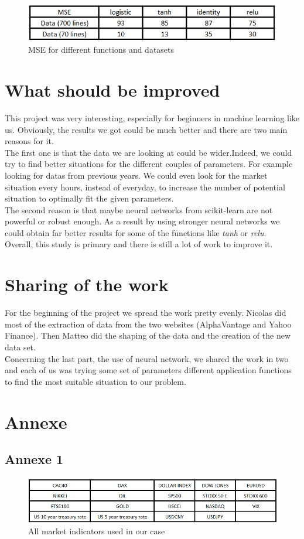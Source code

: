 \documentclass[]{article}
\begin{document}
\begin{figure}[hbt!]
	\center{}
	\includegraphics[scale=0.6]{image/results.png}
	\caption{MSE for different functions and datasets}
\end{figure}


\section{What should be improved}
\vskip 0.3cm
This project was very interesting, especially for beginners  in machine learning like us. Obviously, the results we got could be much better and there are two main reasons for it. \\
The first one is that the data we are looking at could be wider.Indeed, we could try to find better situations for the different couples of parameters. For example looking for datas from previous years. We could even look for the market situation every hours, instead of everyday, to increase the number of potential situation to optimally fit the given parameters. \\
The second reason is that maybe neural networks from scikit-learn are not powerful or robust enough. As a result by using stronger neural networks we could obtain far better results for some of the functions like \textit{tanh} or \textit{relu}. \\
Overall, this study is primary and there is still a lot of work to improve it.


\section{Sharing of the work}

\vskip 0.3cm
For the beginning of the project we spread the work pretty evenly.
Nicolas did most of the extraction of data from the two websites (AlphaVantage and Yahoo Finance). 
Then Matteo did the shaping of the data and the creation of the new data set.\\
Concerning the last part, the use of neural network, we shared the work in two and each of us was trying some set of parameters different application functions to find the most suitable situation to our problem.

\section{Annexe}
\subsection{Annexe 1} 
\begin{figure}[hbt!]
	\center{}
	\includegraphics[scale=0.5]{image/marketSituation.png}
	\caption{All market indicators used in our case}
\end{figure}
\end{document}
